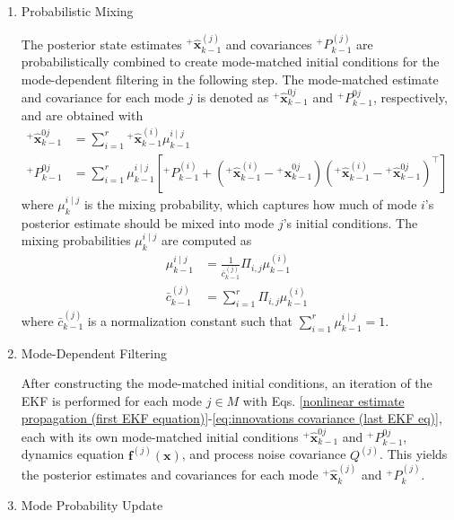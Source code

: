 \begin{enumerate}
    \item Probabilistic Mixing

    The posterior state estimates ${}^+\hat{\bm{x}}_{k-1}^{(j)}$ and covariances ${}^+P_{k-1}^{(j)}$ are probabilistically combined to create mode-matched initial conditions for the mode-dependent filtering in the following step. The mode-matched estimate and covariance for each mode $j$ is denoted as ${}^{+}\hat{\bm{x}}_{k-1}^{0j}$ and ${}^+P_{k-1}^{0j}$, respectively, and are obtained with
    \begin{align}
        {}^+\hat{\bm{x}}_{k-1}^{0j} &= \sum_{i=1}^r {}^+\hat{\bm{x}}_{k-1}^{(i)} \mu_{k-1}^{i \mid j} \label{eq:mixed-initial-mean}\\
        {}^+P_{k-1}^{0j} &= \sum_{i=1}^r  \mu_{k-1}^{i \mid j} [{}^+P_{k-1}^{(i)} + ({}^+\bm{\hat{x}}_{k-1}^{(i)} - {}^+\bm{\hat{x}}_{k-1}^{0j})({}^+\bm{\hat{x}}_{k-1}^{(i)} - {}^+\bm{\hat{x}}_{k-1}^{0j})^\top ] \label{eq:mixed-initial-covariance}
    \end{align}
    \noindent where $\mu_k^{i \mid j}$ is the mixing probability, which captures how much of mode $i$'s posterior estimate should be mixed into mode $j$'s initial conditions. The mixing probabilities $\mu_k^{i \mid j}$ are computed as
    \begin{align}
        \mu_{k-1}^{i \mid j} &= \frac{1}{\bar{c}_{k-1}^{(j)}} \Pi_{i,j} \mu_{k-1}^{(i)} \\
        \bar{c}_{k-1}^{(j)} &= \sum_{i=1}^r \Pi_{i,j} \mu_{k-1}^{(i)} \label{mixing probability constant}
    \end{align}
    \noindent where $\bar{c}_{k-1}^{(j)}$ is a normalization constant such that $\sum_{i=1}^r \mu_{k-1}^{i \mid j} = 1$.
    
    \item Mode-Dependent Filtering

    After constructing the mode-matched initial conditions, an iteration of the EKF is performed for each mode $j \in M$ with Eqs. \ref{nonlinear estimate propagation (first EKF equation)}-\ref{eq:innovations covariance (last EKF eq)}, each with its own mode-matched initial conditions ${}^+\bm{\hat{x}}_{k-1}^{0j}$ and ${}^+P_{k-1}^{0j}$, dynamics equation $\bm{f}^{(j)}(\bm{x})$, and process noise covariance $Q^{(j)}$. This yields the posterior estimates and covariances for each mode ${}^+\hat{\bm{x}}_k^{(j)}$ and ${}^+P_k^{(j)}$.

    \item Mode Probability Update


\end{enumerate}
